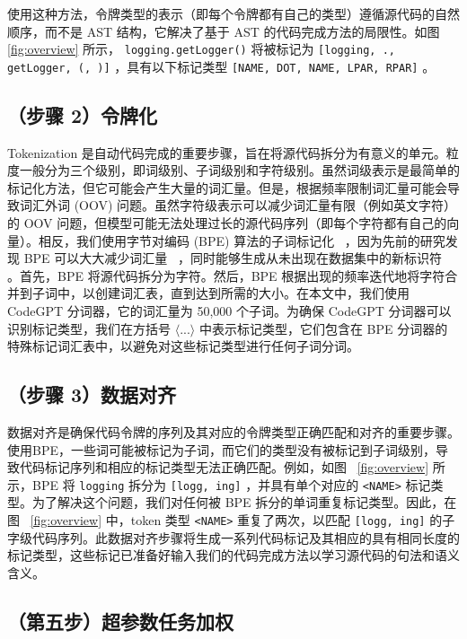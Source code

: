 \documentclass[UTF8]{article}
\begin{document}
使用这种方法，令牌类型的表示（即每个令牌都有自己的类型）遵循源代码的自然顺序，而不是 AST 结构，它解决了基于 AST 的代码完成方法的局限性。如图~    \ref{fig:overview}    所示，   \texttt{logging.getLogger()}    将被标记为    \texttt{[logging, ., getLogger, (, )]}   ，具有以下标记类型    \texttt{[NAME, DOT, NAME, LPAR, RPAR]}   。

   \subsection{（步骤 2）令牌化}    Tokenization 是自动代码完成的重要步骤，旨在将源代码拆分为有意义的单元。粒度一般分为三个级别，即词级别、子词级别和字符级别。虽然词级表示是最简单的标记化方法，但它可能会产生大量的词汇量。但是，根据频率限制词汇量可能会导致词汇外词 (OOV) 问题。虽然字符级表示可以减少词汇量有限（例如英文字符）的 OOV 问题，但模型可能无法处理过长的源代码序列（即每个字符都有自己的向量）。相反，我们使用字节对编码 (BPE) 算法的子词标记化~    \cite{sennrich2015neural}   ，因为先前的研究发现 BPE 可以大大减少词汇量~    \cite{fu2022gpt2sp, karampatsis2020big}   ，同时能够生成从未出现在数据集中的新标识符~    \cite{thongtanunam2022autotransform}   。首先，BPE 将源代码拆分为字符。然后，BPE 根据出现的频率迭代地将字符合并到子词中，以创建词汇表，直到达到所需的大小。在本文中，我们使用 CodeGPT 分词器，它的词汇量为 50,000 个子词。为确保 CodeGPT 分词器可以识别标记类型，我们在方括号    $\langle...\rangle$    中表示标记类型，它们包含在 BPE 分词器的特殊标记词汇表中，以避免对这些标记类型进行任何子词分词。

   \subsection{（步骤 3）数据对齐}    数据对齐是确保代码令牌的序列及其对应的令牌类型正确匹配和对齐的重要步骤。使用BPE，一些词可能被标记为子词，而它们的类型没有被标记到子词级别，导致代码标记序列和相应的标记类型无法正确匹配。例如，如图~    \ref{fig:overview}    所示，BPE 将    \texttt{logging}    拆分为    \texttt{[logg, ing]}   ，并具有单个对应的    \texttt{<NAME>}    标记类型。为了解决这个问题，我们对任何被 BPE 拆分的单词重复标记类型。因此，在图~    \ref{fig:overview}    中，token 类型    \texttt{<NAME>}    重复了两次，以匹配    \texttt{[logg, ing]}    的子字级代码序列。此数据对齐步骤将生成一系列代码标记及其相应的具有相同长度的标记类型，这些标记已准备好输入我们的代码完成方法以学习源代码的句法和语义含义。

      

   \subsection{（第五步）超参数任务加权}   
    \label{sec:approach-weight}   
\end{document}
